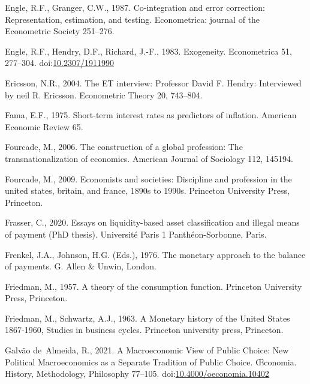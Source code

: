 \documentclass[
  12pt,
  onecolumn]{article}
\newlength{\cslhangindent}
\newlength{\cslentryspacingunit} %
\newenvironment{CSLReferences}[2] %
 {%
  \setlength{\parindent}{0pt}
  \ifodd #1
  \let\oldpar\par
  \def\par{\hangindent=\cslhangindent\oldpar}
  \fi
  \setlength{\parskip}{#2\cslentryspacingunit}
 }%
 {}
\begin{document}
\begin{CSLReferences}{1}{0}
\leavevmode{}%
Engle, R.F., Granger, C.W., 1987. Co-integration and error correction:
Representation, estimation, and testing. Econometrica: journal of the
Econometric Society 251--276.

\leavevmode{}%
Engle, R.F., Hendry, D.F., Richard, J.-F., 1983. Exogeneity.
Econometrica 51, 277--304.
doi:\href{https://doi.org/10.2307/1911990}{10.2307/1911990}

\leavevmode{}%
Ericsson, N.R., 2004. The {ET} interview: {Professor David F}. {Hendry}:
{Interviewed} by neil {R}. {Ericsson}. Econometric Theory 20, 743--804.

\leavevmode{}%
Fama, E.F., 1975. Short-term interest rates as predictors of inflation.
American Economic Review 65.

\leavevmode{}%
Fourcade, M., 2006. The construction of a global profession: The
transnationalization of economics. American Journal of Sociology 112,
145194.

\leavevmode{}%
Fourcade, M., 2009. Economists and societies: Discipline and profession
in the united states, britain, and france, 1890s to 1990s. Princeton
University Press, Princeton.

\leavevmode{}%
Frasser, C., 2020. Essays on liquidity-based asset classiﬁcation and
illegal means of payment (PhD thesis). Université Paris 1
Panthéon-Sorbonne, Paris.

\leavevmode{}%
Frenkel, J.A., Johnson, H.G. (Eds.), 1976. The monetary approach to the
balance of payments. {G. Allen \& Unwin}, {London}.

\leavevmode{}%
Friedman, M., 1957. A theory of the consumption function. Princeton
University Press, Princeton.

\leavevmode{}%
Friedman, M., Schwartz, A.J., 1963. A {Monetary} history of the {United}
{States} 1867-1960, Studies in business cycles. Princeton university
press, Princeton.

\leavevmode{}%
Galvão de~Almeida, R., 2021. A {Macroeconomic View} of {Public Choice}:
{New Political Macroeconomics} as a {Separate Tradition} of {Public
Choice}. Œconomia. History, Methodology, Philosophy 77--105.
doi:\href{https://doi.org/10.4000/oeconomia.10402}{10.4000/oeconomia.10402}


\end{CSLReferences}
\end{document}
